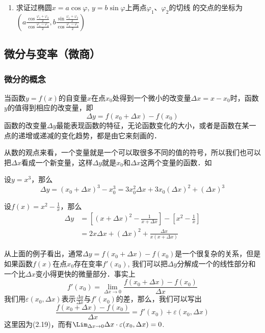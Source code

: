 \begin{ex}
\begin{enumerate}
\item 求证过椭圆$x=a\cos\varphi$, $y=b\sin\varphi$上两点$\varphi_1$、$\varphi_2$的切线
的交点的坐标为
$\left(a\frac{\cos\frac{\varphi_1+\varphi_2}{2}}{\cos\frac{\varphi_1-\varphi_2}{2}}, b\frac{\sin\frac{\varphi_1+\varphi_2}{2}}{\cos\frac{\varphi_1-\varphi_2}{2}}\right)$
\end{enumerate}
\end{ex}

\subsection{微分与变率（微商）}

\subsubsection{微分的概念}

当函数$y=f(x)$的自变量$x$在点$x_0$处得到一个微小的改变量$\Delta x=x-x_0$时，函数$y$的值得到相应的改变量，即
\begin{equation}
    \Delta y=f (x_0+\Delta x) -f (x_0) 
\end{equation} 
函数的改变量$\Delta y$最能表现函数的特征，无论函数变化的大小，或者是函数在某一点的递增或递减的变化趋势，都是由它来刻画的．

从数的观点来看，一个变量就是一个可以取很多不同的值的符号，所以我们也可以把$\Delta x$看成一个新变量，这样$\Delta y$就是$x_0$和$\Delta x$这两个变量的函数．如

\begin{example}
    设$y=x^3$，那么
\[\Delta y=(x_0+\Delta x)^3-x^3_0 =3x_0^2\Delta x+3x_0(\Delta x)^2+(\Delta x)^3\]
\end{example}

\begin{example}
    设$f(x)=x^2-\frac{1}{x}$，那么
\begin{align*}
    \Delta y&=\left[(x+\Delta x)^2-\frac{1}{x+\Delta x}\right]-\left[x^2-\frac{1}{x}\right]\\
    &=2x\Delta x+(\Delta x)^2+\frac{\Delta x}{x(x+\Delta x)}
\end{align*} 
\end{example}

从上面的例子看出，通常$\Delta y=f(x_0+\Delta x)-f(x_0)$是一个很复杂的关系，但是如果函数$f(x)$在点$x_0$存在变率$f'(x_0)$, 我们可以把$\Delta y$分解成一个的线性部分和一个比$\Delta x$变小得更快的微量部分．事实上
\begin{equation}
 f'(x_0)=\lim_{\Delta x\to 0}\frac{f(x_0+\Delta x)-f(x_0)}{\Delta x}
\end{equation}
我们用$\varepsilon(x_0,\Delta x)$表示$\frac{\Delta 
y}{\Delta x}$与$f'(x_0)$的差，那么，我们可以写出
\begin{equation}
\frac{f(x_0+\Delta x)-f(x_0)}{\Delta x}=f'(x_0)+\varepsilon(x_0,\Delta x)
\end{equation}
这里因为(2.19)，而有$\Lim_{\Delta x\to 0}\Delta x \cdot \varepsilon(x_0,\Delta x)=0$.

